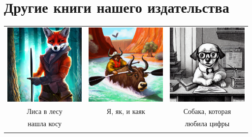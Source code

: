 \documentclass[a5paper,11pt]{memoir}
\begin{document}
\cleartoverso
\thispagestyle{empty}  %


\section*{Другие книги нашего издательства}

\begin{table}[h]
\begin{tabular}{ccc}
\includegraphics[height=4cm]{images/lisa-v-lesu} & \includegraphics[height=4cm]{images/yak-kayak} & \includegraphics[height=4cm]{images/dog-book-cooker}             \\
 Лиса в лесу    &  Я, як, и каяк        &   Собака, которая            \\
  нашла косу &  & любила цифры \\
            &          &              \\

\end{tabular}
\end{table}
\end{document}
